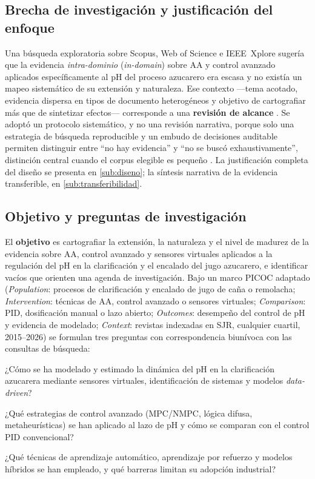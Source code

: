 \subsection{Brecha de investigación y justificación del enfoque}
\label{sub:brecha}

Una búsqueda exploratoria sobre Scopus, Web of Science e IEEE~Xplore
sugería que la evidencia \textit{intra-dominio} (\textit{in-domain}) sobre
AA y control avanzado aplicados específicamente al pH del proceso
azucarero era escasa y no existía un mapeo sistemático de su extensión y
naturaleza. Ese contexto ---tema acotado, evidencia dispersa en tipos de
documento heterogéneos y objetivo de cartografiar más que de sintetizar
efectos--- corresponde a una \textbf{revisión de alcance}
\parencite{arksey2005scoping,levac2010scoping,peters2020scoping}. Se
adoptó un protocolo sistemático, y no una revisión narrativa, porque solo
una estrategia de búsqueda reproducible y un embudo de decisiones
auditable permiten distinguir entre ``no hay evidencia'' y ``no se buscó
exhaustivamente'', distinción central cuando el corpus elegible es
pequeño \parencite{lang2007empty,yaffe2012empty}. La justificación
completa del diseño se presenta en \ref{sub:diseno}; la síntesis
narrativa de la evidencia transferible, en \ref{sub:transferibilidad}.

\subsection{Objetivo y preguntas de investigación}
\label{sub:rqs}

El \textbf{objetivo} es cartografiar la extensión, la naturaleza y el
nivel de madurez de la evidencia sobre AA, control avanzado y sensores
virtuales aplicados a la regulación del pH en la clarificación y el
encalado del jugo azucarero, e identificar vacíos que orienten una agenda
de investigación. Bajo un marco PICOC adaptado
(\textit{Population}: procesos de clarificación y encalado de jugo de caña
o remolacha; \textit{Intervention}: técnicas de AA, control avanzado o
sensores virtuales; \textit{Comparison}: PID, dosificación manual o lazo
abierto; \textit{Outcomes}: desempeño del control de pH y evidencia de
modelado; \textit{Context}: revistas indexadas en SJR, cualquier cuartil,
2015--2026) se formulan tres preguntas con correspondencia biunívoca con
las consultas de búsqueda:

\begin{description}[style=nextline,leftmargin=2cm,labelindent=0cm]
\item[\textbf{RQ1}] ¿Cómo se ha modelado y estimado la dinámica del pH
en la clarificación azucarera mediante sensores virtuales, identificación
de sistemas y modelos \textit{data-driven}?
\item[\textbf{RQ2}] ¿Qué estrategias de control avanzado (MPC/NMPC,
lógica difusa, metaheurísticas) se han aplicado al lazo de pH y cómo se
comparan con el control PID convencional?
\item[\textbf{RQ3}] ¿Qué técnicas de aprendizaje automático, aprendizaje
por refuerzo y modelos híbridos se han empleado, y qué barreras limitan
su adopción industrial?
\end{description}

